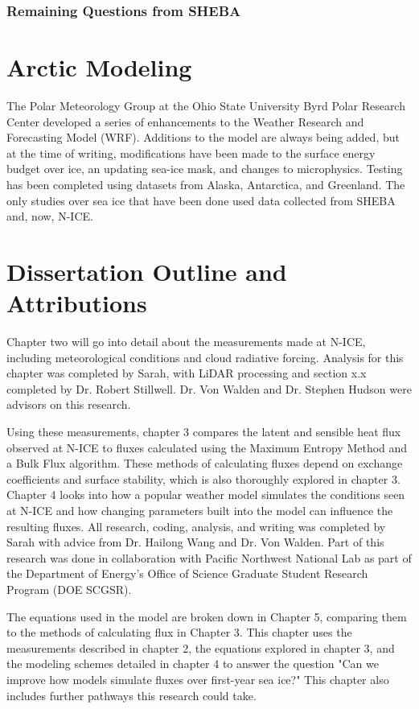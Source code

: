 \subsubsection{Remaining Questions from SHEBA}



\section{Arctic Modeling}
The Polar Meteorology Group at the Ohio State University Byrd Polar Research Center developed a series of enhancements to the Weather Research and Forecasting Model (WRF). Additions to the model are always being added, but at the time of writing, modifications have been made to the surface energy budget over ice, an updating sea-ice mask, and changes to microphysics. Testing has been completed using datasets from Alaska, Antarctica, and Greenland. The only studies over sea ice that have been done used data collected from SHEBA and, now, N-ICE. 

\section{Dissertation Outline and Attributions}
Chapter two will go into detail about the measurements made at N-ICE, including meteorological conditions and cloud radiative forcing. Analysis for this chapter was completed by Sarah, with LiDAR processing and section x.x completed by Dr. Robert Stillwell. Dr. Von Walden and Dr. Stephen Hudson were advisors on this research. 

Using these measurements, chapter 3 compares the latent and sensible heat flux observed at N-ICE to fluxes calculated using the Maximum Entropy Method and a Bulk Flux algorithm. These methods of calculating fluxes depend on exchange coefficients and surface stability, which is also thoroughly explored in chapter 3. Chapter 4 looks into how a popular weather model simulates the conditions seen at N-ICE and how changing parameters built into the model can influence the resulting fluxes. All research, coding, analysis, and writing was completed by Sarah with advice from Dr. Hailong Wang and Dr. Von Walden. Part of this research was done in collaboration with Pacific Northwest National Lab as part of the Department of Energy's Office of Science Graduate Student Research Program (DOE SCGSR).

The equations used in the model are broken down in Chapter 5, comparing them to the methods of calculating flux in Chapter 3. This chapter uses the measurements described in chapter 2, the equations explored in chapter 3, and the modeling schemes detailed in chapter 4 to answer the question "Can we improve how models simulate fluxes over first-year sea ice?" This chapter also includes further pathways this research could take.

